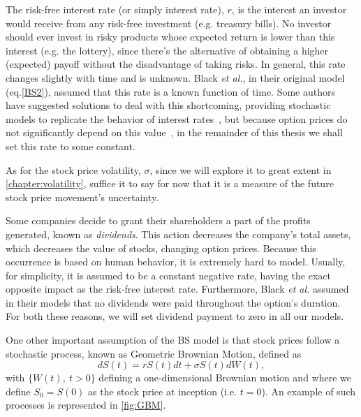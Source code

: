 The risk-free interest rate (or simply interest rate), $r$, is the interest an investor would receive from any risk-free investment (e.g. treasury bills). No investor should ever invest in risky products whose expected return is lower than this interest (e.g. the lottery), since there's the alternative of obtaining a higher (expected) payoff without the disadvantage of taking risks. In general, this rate changes slightly with time and is unknown. Black \textit{et al.}, in their original model (eq.\eqref{BS2}), assumed that this rate is a known function of time. Some authors have suggested solutions to deal with this shortcoming, providing stochastic models to replicate the behavior of interest rates~\citep{HJM}, but because option prices do not significantly depend on this value~\citep{Wilmott3}, in the remainder of this thesis we shall set this rate to some constant.

As for the stock price volatility, $\sigma$, since we will explore it to great extent in \autoref{chapter:volatility}, suffice it to say for now that it is a measure of the future stock price movement's uncertainty.

Some companies decide to grant their shareholders a part of the profits generated, known as \emph{dividends}. This action decreases the company's total assets, which decreases the value of stocks, changing option prices. Because this occurrence is based on human behavior, it is extremely hard to model. Usually, for simplicity, it is assumed to be a constant negative rate, having the exact opposite impact as the risk-free interest rate. Furthermore, Black \textit{et al.} assumed in their models that no dividends were paid throughout the option's duration. For both these reasons, we will set dividend payment to zero in all our models.


One other important assumption of the BS model is that stock prices follow a stochastic process, known as Geometric Brownian Motion, defined as
\begin{equation}\label{GBM}
dS(t)=rS(t)dt+\sigma S(t)dW(t),
\end{equation}
\noindent with $\{W(t),\ t>0\}$ defining a one-dimensional Brownian motion and where we define $S_0=S(0)$ as the stock price at inception (i.e. $t=0$). An example of such processes is represented in \autoref{fig:GBM}.

